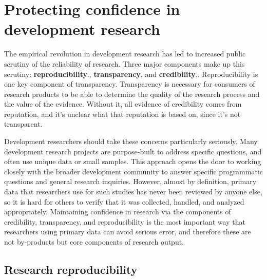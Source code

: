
\section{Protecting confidence in development research}

The empirical revolution in development research
has led to increased public scrutiny of the reliability of research.\cite{rogers_2017}
Three major components make up this scrutiny: \textbf{reproducibility}.\cite{duvendack2017meant}, \textbf{transparency},\cite{christensen2018transparency} and \textbf{credibility},\cite{ioannidis2017power}.
Reproducibility is one key component of transparency.
Transparency is necessary for consumers of research products
to be able to determine the quality of the research process and the value of the evidence.
Without it, all evidence of credibility comes from reputation,
and it's unclear what that reputation is based on, since it's not transparent.

Development researchers should take these concerns particularly seriously.
Many development research projects are purpose-built to address specific questions,
and often use unique data or small samples.
This approach opens the door to working closely with the broader development community
to answer specific programmatic questions and general research inquiries.
However, almost by definition,
primary data that researchers use for such studies has never been reviewed by anyone else,
so it is hard for others to verify that it was collected, handled, and analyzed appropriately.
Maintaining confidence in research via the components of credibility, transparency, and reproducibility
is the most important way that researchers using primary data can avoid serious error,
and therefore these are not by-products but core components of research output.

\subsection{Research reproducibility}

